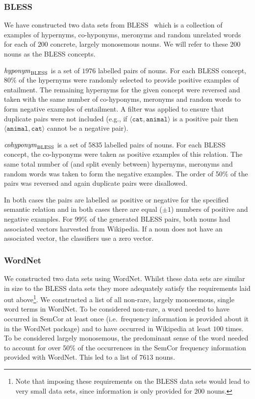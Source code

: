 \documentclass[11pt]{article}
\newcommand\entBLESS{\mbox{\em hyponym\/}_{\mbox{\scriptsize BLESS}}}
\newcommand\coordBLESS{\mbox{\em cohyponym\/}_{\mbox{\scriptsize BLESS}}}
\begin{document}
\subsubsection{BLESS}

We have constructed two  data sets from BLESS~\cite{Baroni2011} which is a collection of examples of hypernyms, co-hyponyms, meronyms and random unrelated words for each of $200$ concrete, largely monosemous nouns. We will refer to these $200$ nouns as the BLESS concepts.

\smallskip

\noindent $\entBLESS$ is a set of $1976$ labelled pairs of nouns.  For each BLESS concept, 80\% of the hypernyms were randomly selected to provide positive examples of entailment.  The remaining hypernyms for the given concept were reversed and taken with the same number of co-hyponyms, meronyms and random words to form negative examples of entailment.  A filter was applied to ensure that duplicate pairs were not included (e.g., if $\langle\texttt{cat},\texttt{animal}\rangle$ is a positive pair then $\langle\texttt{animal},\texttt{cat}\rangle$ cannot be a negative pair). 

\smallskip

\noindent $\coordBLESS$ is a set of 5835 labelled pairs of nouns.  For each BLESS concept, the co-hyponyms were taken as positive examples of this relation.  The same total number of (and split evenly between) hypernyms, meronyms and random words was taken to form the negative examples.  The order of 50\% of the pairs was reversed and again duplicate pairs were disallowed. 

\smallskip

In both cases the pairs are labelled as positive or negative for the specified semantic relation and in both cases there are equal ($\pm 1$) numbers of positive and negative examples.  For 99\% of the generated BLESS pairs, both nouns had associated vectors harvested from Wikipedia.  If a noun does not have an associated vector, the classifiers use a zero vector.  

\subsubsection{WordNet}

We  constructed two data sets using WordNet.  Whilst these data sets are similar in size to the BLESS data sets they more adequately satisfy the requirements laid out above\footnote{Note that imposing these requirements on the BLESS data sets would lead to very small data sets, since information is only provided for $200$ nouns.}.  We constructed a list of all non-rare, largely monosemous, single word terms in WordNet.  To be considered non-rare, a word needed to have occurred in SemCor at least once (i.e.~frequency information is provided about it in the WordNet package) and to have occurred in Wikipedia at least $100$ times.  To be considered largely monosemous, the predominant sense of the word needed to account for over 50\% of the occurrences in the SemCor frequency information provided with WordNet.  This led to a list of $7613$ nouns. 
\end{document}
